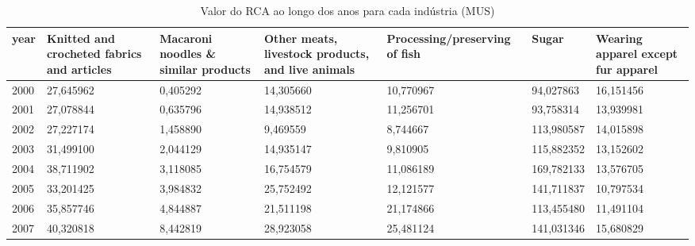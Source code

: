 \begin{table}
\centering
\caption{Valor do RCA ao longo dos anos para cada indústria (MUS)}
\begin{tabular}{p{1cm}p{2cm}p{2cm}p{2cm}p{2cm}p{2cm}p{2cm}}
\toprule
 year &  Knitted and crocheted fabrics and articles &  Macaroni noodles \& similar products &  Other meats, livestock products, and live animals &  Processing/preserving of fish &      Sugar &  Wearing apparel except fur apparel \\
\midrule
 2000 &                                   27,645962 &                             0,405292 &                                          14,305660 &                      10,770967 &  94,027863 &                           16,151456 \\
 2001 &                                   27,078844 &                             0,635796 &                                          14,938512 &                      11,256701 &  93,758314 &                           13,939981 \\
 2002 &                                   27,227174 &                             1,458890 &                                           9,469559 &                       8,744667 & 113,980587 &                           14,015898 \\
 2003 &                                   31,499100 &                             2,044129 &                                          14,935147 &                       9,810905 & 115,882352 &                           13,152602 \\
 2004 &                                   38,711902 &                             3,118085 &                                          16,754579 &                      11,086189 & 169,782133 &                           13,576705 \\
 2005 &                                   33,201425 &                             3,984832 &                                          25,752492 &                      12,121577 & 141,711837 &                           10,797534 \\
 2006 &                                   35,857746 &                             4,844887 &                                          21,511198 &                      21,174866 & 113,455480 &                           11,491104 \\
 2007 &                                   40,320818 &                             8,442819 &                                          28,923058 &                      25,481124 & 141,031346 &                           15,680829 \\

\end{tabular}
\end{table}

